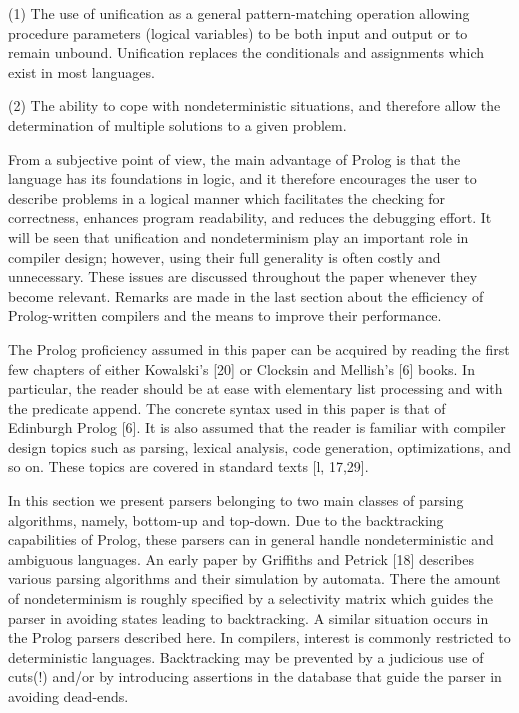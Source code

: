 (1) The use of unification as a general pattern-matching operation allowing
procedure parameters (logical variables) to be both input and output or to
remain unbound. Unification replaces the conditionals and assignments
which exist in most languages. 

(2) The ability to cope with nondeterministic situations, and therefore allow the
determination of multiple solutions to a given problem. 

From a subjective point of view, the main advantage of Prolog is that the
language has its foundations in logic, and it therefore encourages the user to
describe problems in a logical manner which facilitates the checking for correctness,
enhances program readability, and reduces the debugging effort. It will be
seen that unification and nondeterminism play an important role in compiler
design; however, using their full generality is often costly and unnecessary. These
issues are discussed throughout the paper whenever they become relevant.
Remarks are made in the last section about the efficiency of Prolog-written
compilers and the means to improve their performance. 

The Prolog proficiency assumed in this paper can be acquired by reading the
first few chapters of either Kowalski’s [20] or Clocksin and Mellish’s [6] books.
In particular, the reader should be at ease with elementary list processing and
with the predicate append. The concrete syntax used in this paper is that of
Edinburgh Prolog [6]. It is also assumed that the reader is familiar with compiler
design topics such as parsing, lexical analysis, code generation, optimizations,
and so on. These topics are covered in standard texts [l, 17,29]. 


In this section we present parsers belonging to two main classes of parsing
algorithms, namely, bottom-up and top-down. Due to the backtracking capabilities
of Prolog, these parsers can in general handle nondeterministic and
ambiguous languages. An early paper by Griffiths and Petrick [18] describes
various parsing algorithms and their simulation by automata. There the amount
of nondeterminism is roughly specified by a selectivity matrix which guides the
parser in avoiding states leading to backtracking. A similar situation occurs in
the Prolog parsers described here. In compilers, interest is commonly restricted 
to deterministic languages. Backtracking may be prevented by a judicious use of
cuts(!) and/or by introducing assertions in the database that guide the parser in
avoiding dead-ends. 

